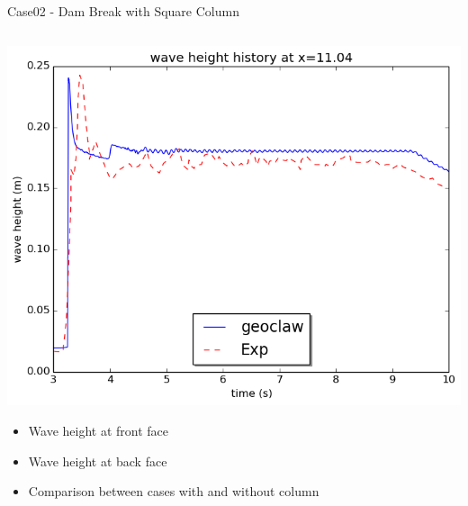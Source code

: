 \documentclass[xcolor=dvipsnames]{beamer}
\begin{document}
\begin{frame}[label=sec-5-5]{Case02 - Dam Break with Square Column}
\begin{columns}
\begin{column}{0.5\textwidth}
\begin{block}{}
\includegraphics[width=.9\linewidth]{../paper/plots/waveheight_square_x1104_largerTimeRange.png} \\
\begin{itemize}
\item Wave height at front face
\item Wave height at back face
\item Comparison between cases with and without column
\end{itemize}
\vskip13mm
\end{block}
\end{column}


\end{columns}
\end{frame}
\end{document}
